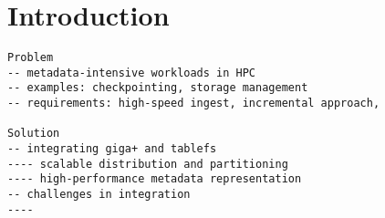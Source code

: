 \section{Introduction}

\begin{verbatim}
Problem
-- metadata-intensive workloads in HPC
-- examples: checkpointing, storage management
-- requirements: high-speed ingest, incremental approach,  

Solution
-- integrating giga+ and tablefs
---- scalable distribution and partitioning
---- high-performance metadata representation
-- challenges in integration
---- 
\end{verbatim}
